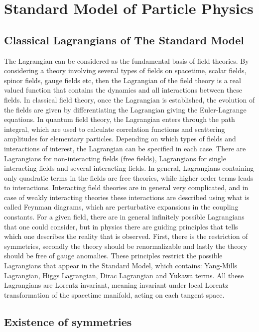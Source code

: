 \section{Standard Model of Particle Physics}


\subsection{Classical Lagrangians of The Standard Model}
The Lagrangian can be considered as the fundamental basis of field theories. By considering a theory involving several types of fields on spacetime, scalar fields, spinor fields, gauge fields etc, then the Lagrangian of the field theory is a real valued function that contains the dynamics and all interactions between these fields. In classical field theory, once the Lagrangian is established, the evolution of the fields are given by differentiating the Lagrangian giving the Euler-Lagrange equations. In quantum field theory, the Lagrangian enters through the path integral, which are used to calculate correlation functions and scattering amplitudes for elementary particles. Depending on which types of fields and interactions of interest, the Lagrangian can be specified in each case. There are Lagrangians for non-interacting fields (free fields), Lagrangians for single interacting fields and several interacting fields. In general, Lagrangians containing only quadratic terms in the fields are free theories, while higher order terms leads to interactions. Interacting field theories are in general very complicated, and in case of weakly interacting theories these interactions are described using what is called Feynman diagrams, which are perturbative expansions in the coupling constants. For a given field, there are in general infinitely possible Lagrangians that one could consider, but in physics there are guiding principles that tells which one describes the reality that is observed. First, there is the restriction of symmetries, secondly the theory should be renormalizable and lastly the theory should be free of gauge anomalies. These principles restrict the possible Lagrangians that appear in the Standard Model, which contains: Yang-Mills Lagrangian, Higgs Lagrangian, Dirac Lagrangian and Yukawa terms. All these Lagrangians are Lorentz invariant, meaning invariant under local Lorentz transformation of the spacetime manifold, acting on each tangent space.

\subsection{Existence of symmetries}

